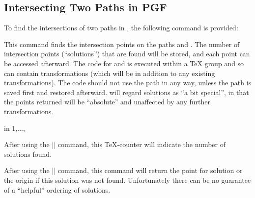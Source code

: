 \subsection{Intersecting Two Paths in PGF}
  
  To find the intersections of two paths in \pgfname, the following 
  command is provided:
   
\begin{command}{\pgfintersectionofpaths{}}
  This command finds the intersection points on the paths 
   and . The number of intersection points
  (``solutions'') that are found will be stored, and each point 
  can be accessed afterward. The code for  and 
   is executed within a \TeX{} group and so can contain
  transformations (which will be in addition to any existing
  transformations). The code should not use the path in any way, 
  unless the path is saved first and restored afterward.
  \pgfname{} will regard solutions as ``a bit
  special'', in that the points returned  will be ``absolute'' and 
  unaffected by any further transformations.

\begin{codeexample}[]
\begin{pgfpicture}
\pgfintersectionofpaths
{
  \pgfgetpath\temppath
  \pgfsetpath\temppath
}
{
  \pgfgetpath\temppath
  \pgfsetpath\temppath
}
\foreach \s in {1,...,\pgfintersectionsolutions}
  {\pgfpathcircle{\pgfpointintersectionsolution{\s}}{2pt}}
\end{pgfpicture}
\end{codeexample}

\end{command}

\begin{command}{\pgfintersectionsolutions}
  After using the |\pgfintersectionofpaths| command, this \TeX-counter
  will indicate the number of solutions found.
\end{command}

\begin{command}{\pgfpointintersectionsolution{}}
  After using the |\pgfintersectionofpaths| command, this command
  will return the point for solution  or the origin
  if this solution was not found. Unfortunately
  there can be no guarantee of a ``helpful'' ordering of solutions.
\end{command}
 
